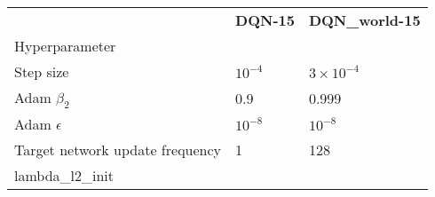 \begin{tabular}{lll}
 & \bfseries DQN-15 & \bfseries DQN_world-15 \\
Hyperparameter &  &  \\
Step size & $10^{-4}$ & $3 \times 10^{-4}$ \\
Adam $\beta_2$ & 0.9 & 0.999 \\
Adam $\epsilon$ & $10^{-8}$ & $10^{-8}$ \\
Target network update frequency & 1 & 128 \\
lambda_l2_init &  &  \\
\end{tabular}
